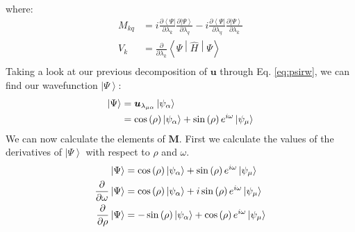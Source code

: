 \documentclass{aux/ttuthes2007}
\newcommand{\bra}[1]{\ensuremath{\left\langle#1\right\vert}}
\newcommand{\ket}[1]{\ensuremath{\left|#1\right\rangle}}
\newcommand{\sandwich}[3]{\left< #1 \middle\vert #2 \middle\vert #3 \right>}
\newcommand{\s}[1]{\sin\left( #1 \right)}
\newcommand{\co}[1]{\cos\left( #1 \right)}
\newcommand{\pd}[1]{\frac{\partial}{\partial #1}}
\newcommand{\kpp}[1]{\frac{\partial \ket\Psi}{\partial #1}}
\newcommand{\bpp}[1]{\frac{\partial \bra\Psi}{\partial #1}}
\newcommand{\ind}[1]{{\uo #1 \oo #1}}
\newcommand{\uo}[1]{
		\IfEqCase{#1}{
			{0}{\mu}
			{1}{\nu}
			{2}{\xi}
		}[\PackageError{uo}{Undefined option to uo: #1}{}]
}
\newcommand{\oo}[1]{
		\IfEqCase{#1}{
			{0}{\alpha}
			{1}{\beta}
			{2}{\gamma}
		}[\PackageError{unocorb}{Undefined option to unuo: #1}{}]
}
\begin{document}
%
where:
\begin{equation*}
	\begin{split}
	M_{kq} 
	&= 
	 	i \bpp{\lambda_k} \kpp{\lambda_q} - i \bpp{\lambda_q} \kpp{\lambda_k} 
	\\
	V_k 
	&= 	\pd{\lambda_k}\sandwich{\Psi}{\hat H}{\Psi} \\
	\end{split}
\end{equation*}
%
Taking a look at our previous decomposition of $\bm u$ through Eq. \ref{eq:psirw}, we can find our wavefunction $\ket\Psi$:
%
\begin{equation*}
	\begin{split}
	\ket \Psi 
	&= \bm u_{\lambda_\ind 0} \ket {\psi_{\oo 0}} \\
	&= \co {\rho} \ket {\psi_{\oo 0}} + \s {\rho}e^{i\omega} \ket{\psi_{\uo 0}} \\
	\end{split}
\end{equation*}
%
We can now calculate the elements of $\bm M$. First we calculate the values of the derivatives of $\ket \Psi$ with respect to $\rho$ and $\omega$.
%
\begin{equation*}
	\begin{split}
		\ket{\Psi} 
		&= \co{\rho}\ket{\psi_{\oo {0}}} + \s\rho e^{i\omega}\ket{\psi_{\uo {0}}} 
		\\
		\pd\omega\ket\Psi 
		&= \co\rho\ket{\psi_{\oo {0}}} + i\s\rho e^{i\omega}\ket{\psi_{\uo {0}}} 
		\\
		\pd\rho\ket\Psi 
		&= -\s\rho\ket{\psi_{\oo {0}}} + \co\rho e^{i\omega}\ket{\psi_{\uo {0}}} 
	\end{split}
\end{equation*}
\end{document}
